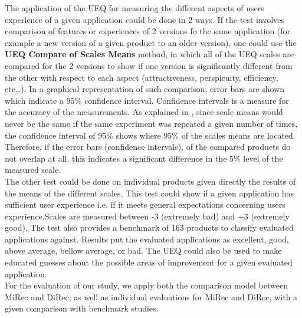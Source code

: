 The application of the UEQ for measuring the different aspects of users
experience of a given application could be done in 2 ways. If the test involves
comparison of features or experiences of 2 versions fo the same application
(for example a new version of a given product to an older version), one could
use the \textbf{UEQ Compare of Scales Means} method, in which all of the UEQ
scales are compared for the 2 versions to show if one version is significantly different
from the other with respect to each aspect (attractiveness, perspicuity,
efficiency, etc\ldots). In a graphical representation of such comparison,
error bars are shown which indicate a 95\% confidence interval. Confidence
intervals is a measure for the accuracy of the measurements. As explained in
\cite{UEQHandbook}, since scale means would never be the same if the same
experiment was repeated a given number of times, the confidence interval of 95\%
shows where 95\% of the scales means are located. Therefore, if the error bars
(confidence intervals), of the compared products do not overlap at all, this
indicates a significant difference in the 5\% level of the measured scale.\\
The other test could be done on individual products given directly the results
of the means of the different scales. This test could show if a given
application has sufficient user experience i.e. if it meets general
expectations concerning users experience.Scales are measured between -3
(extremely bad) and +3 (extremely good). The test also provides a benchmark of
163 products to classify evaluated applications against. Results put the
evaluated applications as excellent, good, above average, bellow average,
or bad. The UEQ could also be used to make educated guesses about the possible
areas of improvement for a given evaluated application.\\
For the evaluation of our study, we apply both the comparison model between
MiRec and DiRec, as well as individual evaluations for MiRec and DiRec, with a
given comparison with benchmark studies.
